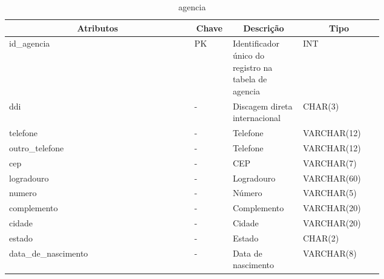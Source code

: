 \begin{enumerate}
    \begin{table}[H]
    \caption{agencia}
    \label{idioma}
    	\centering\footnotesize
        \begin{tabular}{|p{0.40\linewidth} | p{0.04\linewidth} |  p{0.12\linewidth} | p{0.16\linewidth} |}  \hline
        \multicolumn{1}{|c|}{\textbf{Atributos}} &
        \multicolumn{1}{|c|}{\textbf{Chave}} &
        \multicolumn{1}{c|}{\textbf{Descrição}} &
        \multicolumn{1}{c|}{\textbf{Tipo}} \\ \hline
          
        id\_agencia &  
        PK & 
        Identificador único do registro na tabela de agencia &
        INT
        \\  \hline
        
        ddi  &  
        - & 
        Discagem direta internacional &
        CHAR(3)
        \\  \hline
        
        telefone  &  
        - & 
        Telefone &
        VARCHAR(12)
        \\  \hline
        
        outro\_telefone  &  
        - & 
        Telefone &
        VARCHAR(12)
        \\  \hline
        
        cep  &  
        - & 
        CEP &
        VARCHAR(7)
        \\  \hline
        
        logradouro  &  
        - & 
        Logradouro &
        VARCHAR(60)
        \\  \hline
        
        numero  &  
        - & 
        Número &
        VARCHAR(5)
        \\  \hline
        
        complemento  &  
        - & 
        Complemento &
        VARCHAR(20)
        \\  \hline
        
        cidade  &  
        - & 
        Cidade &
        VARCHAR(20)
        \\  \hline
        
        estado  &  
        - & 
        Estado &
        CHAR(2)
        \\  \hline
        
        data\_de\_nascimento  &  
        - & 
        Data de nascimento &
        VARCHAR(8)
        \\  \hline
        

\end{tabular}
\end{table}
\end{enumerate}
